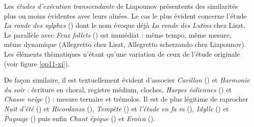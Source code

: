 Les \emph{études d'exécution transcendante} de Liapounov présentents des similarités plus ou moins évidentes avec leurs aînées. Le cas le plus évident concerne l'étude \emph{La ronde des sylphes} () dont le nom évoque déjà \emph{La ronde des Lutins} chez Liszt. Le parallèle avec \emph{Feux follets} () est immédiat : même tempo, même mesure, même dynamique (Allegretto chez Liszt, Allegretto scherzando chez Liapounov). Les éléments thèmatiques n'étant qu'une variation de ceux de l'étude originale (voir figure \ref{op11-xi}).

De façon similaire, il est textuellement évident d'associer \emph{Carillon} () et \emph{Harmonie du soir} : écriture en choral, registre médium, cloches, \emph{Harpes éoliennes} () et \emph{Chasse neige} () : mesure ternaire et trémolos. Il est de plus légitime de raprocher \emph{Nuit d'été} () et \emph{Ricordanza} (), \emph{Tempête} () et \emph{l'étude en fa m} (), \emph{Idylle} () et \emph{Paysage} () puis enfin \emph{Chant épique} () et \emph{Eroica} ().

